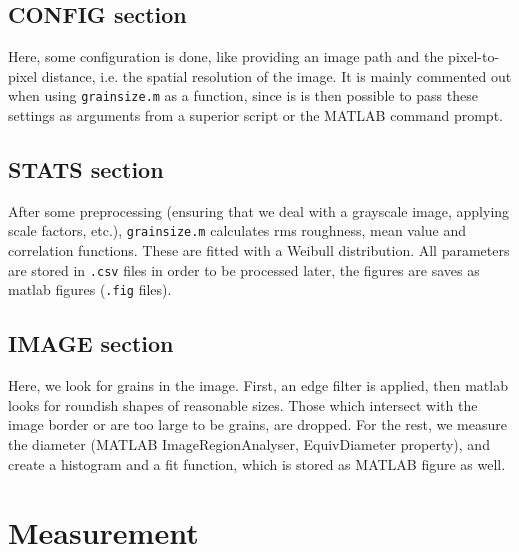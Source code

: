 \documentclass[11pt,a4paper]{article}
\newcommand{\grainsize}{\texttt{grainsize.m}\xspace}
\begin{document}
\subsection{CONFIG section}
Here, some configuration is done, like providing an image path and the pixel-to-pixel distance, i.e. the spatial resolution of the image. It is mainly commented out when using \grainsize as a function, since is is then possible to pass these settings as arguments from a superior script or the MATLAB command prompt.
\subsection{STATS section}
After some preprocessing (ensuring that we deal with a grayscale image, applying scale factors, etc.), \grainsize calculates rms roughness, mean value and correlation functions. These are fitted with a Weibull distribution. All parameters are stored in \texttt{.csv} files in order to be processed later, the figures are saves as matlab figures (\texttt{.fig} files).
\subsection{IMAGE section}
Here, we look for grains in the image. First, an edge filter is applied, then matlab looks for roundish shapes of reasonable sizes. Those which intersect with the image border or are too large to be grains, are dropped. For the rest, we measure the diameter (MATLAB ImageRegionAnalyser, EquivDiameter property), and create a histogram and a fit function, which is stored as MATLAB figure as well.




\section{Measurement}
\end{document}

